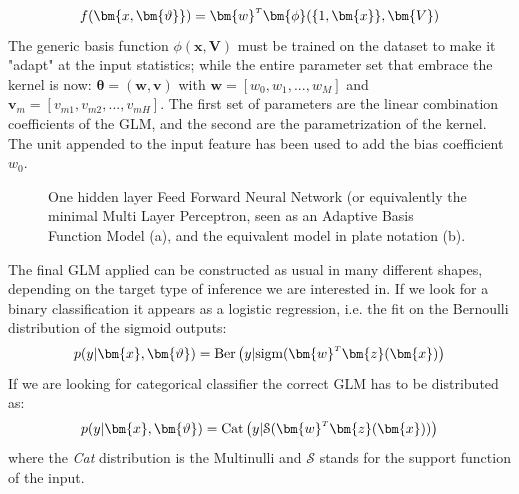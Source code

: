 \begin{equation}
    f(\bm{x,\bm{\vartheta}}) = \transpose{\bm{w}}\bm{\phi}(\{1,\bm{x}\}, \bm{V})
\end{equation}
The generic basis function $\phi(\bm{x},\bm{V})$ must be trained on the dataset to make it "adapt" at the input statistics; while the entire parameter set that embrace the kernel is now: $\bm{\theta} = (\bm{w}, \bm{v})$ with $\bm{w} = [w_0, w_1, ..., w_M]$ and $\bm{v}_m = [v_{m1}, v_{m2}, ..., v_{mH}]$. The first set of parameters are the linear combination coefficients of the \ac{GLM}, and the second are the parametrization of the kernel. The unit appended to the input feature has been used to add the bias coefficient $w_0$.
%
\begin{figure}
    \centering
    \caption{One hidden layer Feed Forward Neural Network (or equivalently the minimal Multi Layer Perceptron, seen as an Adaptive Basis Function Model (a), and the equivalent model in plate notation (b). }
    \label{fig:generic_mlp}
\end{figure}

The final \acl{GLM} applied can be constructed as usual in many different shapes, depending on the target type of inference we are interested in. If we look for a binary classification it appears as a logistic regression, i.e. the fit on the Bernoulli distribution of the sigmoid outputs:
\begin{equation}
    p(y|\bm{x}, \bm{\vartheta}) = \text{Ber}\left( y|\text{sigm}(\transpose{\bm{w}}\bm{z}(\bm{x}) \right)
\end{equation}
If we are looking for categorical classifier the correct GLM has to be distributed as:
\begin{equation}
    p(y|\bm{x}, \bm{\vartheta}) = \text{Cat}\left( y|\mathcal{S}(\transpose{\bm{w}}\bm{z}(\bm{x})) \right)
\end{equation}
where the \textit{Cat} distribution is the Multinulli and $\mathcal{S}$ stands for the support function of the input.


